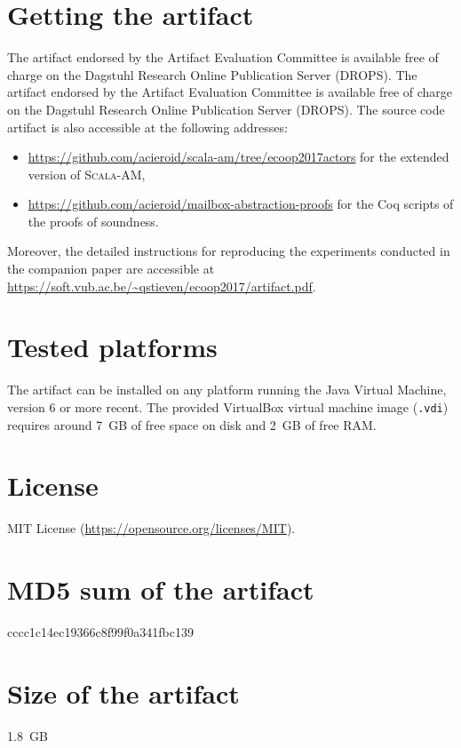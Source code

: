 \documentclass[a4paper,UKenglish]{darts}
\newenvironment{getting}{\section{Getting the artifact} The artifact 
endorsed by the Artifact Evaluation Committee is available free of 
charge on the Dagstuhl Research Online Publication Server (DROPS).}{}
\newenvironment{platforms}{\section{Tested platforms}}{}
\newcommand{\license}[1]{{\section{License}#1}}
\newcommand{\mdsum}[1]{{\section{MD5 sum of the artifact}#1}}
\newcommand{\artifactsize}[1]{{\section{Size of the artifact}#1}}
\newcommand{\code}[1]{\texttt{#1}}
\begin{document}
\begin{getting}
  The artifact endorsed by the Artifact Evaluation Committee is available free of charge on the Dagstuhl Research Online Publication Server (DROPS).
  The source code artifact is also accessible at the following addresses:
  \begin{itemize}
  \item \url{https://github.com/acieroid/scala-am/tree/ecoop2017actors} for the extended version of \textsc{Scala-AM},
    \item \url{https://github.com/acieroid/mailbox-abstraction-proofs} for the Coq scripts of the proofs of soundness.
  \end{itemize}
  Moreover, the detailed instructions for reproducing the experiments conducted in the companion paper are accessible at \url{https://soft.vub.ac.be/~qstieven/ecoop2017/artifact.pdf}.
\end{getting}

\begin{platforms}
  The artifact can be installed on any platform running the Java Virtual Machine, version 6 or more recent. The provided VirtualBox virtual machine image (\code{.vdi}) requires around 7~GB of free space on disk and 2~GB of free RAM.
\end{platforms}

\license{MIT License (\url{https://opensource.org/licenses/MIT}).}

\mdsum{cccc1c14ec19366c8f99f0a341fbc139}

\artifactsize{1.8~GB}
\end{document}
